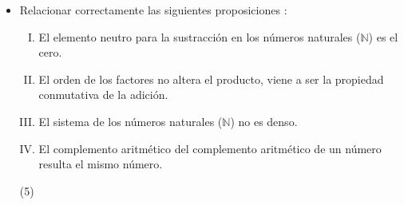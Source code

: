 \documentclass[12pt, a4paper]{article}
\begin{document}
\begin{itemize}
	\item{Relacionar correctamente las siguientes proposiciones :

\begin{enumerate}[I.]
\item El elemento neutro para la sustracción en los números naturales ($\mathbb{N}$) es el cero.
\item El orden de los factores no altera el producto, viene a ser la propiedad conmutativa de la adición.
\item El sistema de los números naturales ($\mathbb{N}$) no es denso.
\item El complemento aritmético del complemento aritmético de un número resulta el mismo número.

\end{enumerate}

	\begin{tasks}(5)
	\end{tasks}
	}
	

\end{itemize}
\end{document}
